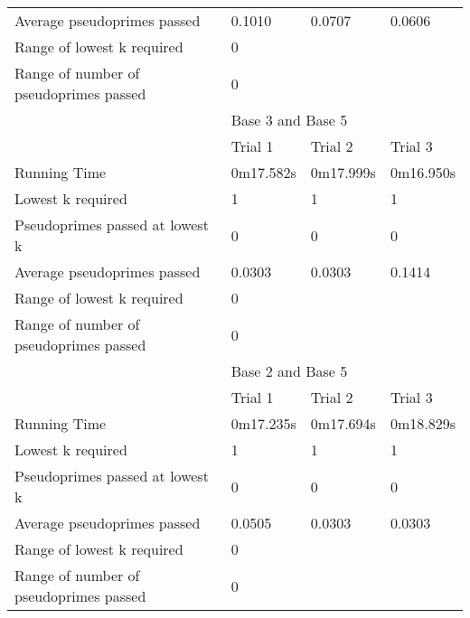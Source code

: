 \documentclass{article}
\begin{document}
\begin{appendices}
\begin{longtable}{llll}
Average pseudoprimes passed            & 0.1010    & 0.0707    & 0.0606         \\
\cmidrule(lr){2-2}\cmidrule(lr){3-3}\cmidrule(lr){4-4}
Range of lowest k required             & \multicolumn{3}{l}{0}                  \\
Range of number of pseudoprimes passed & \multicolumn{3}{l}{0}                  \\
\midrule
                                       & \multicolumn{3}{l}{Base 3 and Base 5}  \\
\midrule
                                       & Trial 1   & Trial 2   & Trial 3        \\
Running Time                           & 0m17.582s & 0m17.999s & 0m16.950s      \\
Lowest k required                      & 1         & 1         & 1              \\
Pseudoprimes passed at lowest k        & 0         & 0         & 0              \\
Average pseudoprimes passed            & 0.0303    & 0.0303    & 0.1414         \\
\cmidrule(lr){2-2}\cmidrule(lr){3-3}\cmidrule(lr){4-4}
Range of lowest k required             & \multicolumn{3}{l}{0}                  \\
Range of number of pseudoprimes passed & \multicolumn{3}{l}{0}                  \\
\midrule
                                       & \multicolumn{3}{l}{Base 2 and Base 5}  \\
\midrule
                                       & Trial 1   & Trial 2   & Trial 3        \\
Running Time                           & 0m17.235s & 0m17.694s & 0m18.829s      \\
Lowest k required                      & 1         & 1         & 1              \\
Pseudoprimes passed at lowest k        & 0         & 0         & 0              \\
Average pseudoprimes passed            & 0.0505    & 0.0303    & 0.0303         \\
\cmidrule(lr){2-2}\cmidrule(lr){3-3}\cmidrule(lr){4-4}
Range of lowest k required             & \multicolumn{3}{l}{0}                  \\
Range of number of pseudoprimes passed & \multicolumn{3}{l}{0}                  \\
\bottomrule
\end{longtable}
\FloatBarrier

\end{appendices}
\end{document}

